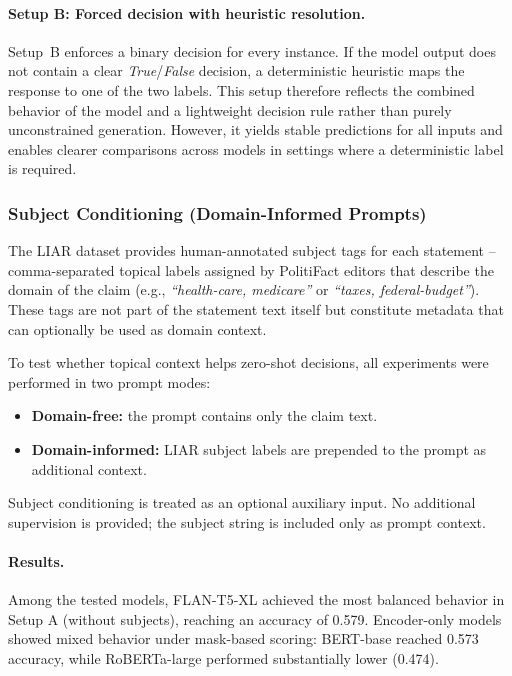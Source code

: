 \paragraph{Setup B: Forced decision with heuristic resolution.}
Setup~B enforces a binary decision for every instance. If the model output does not contain a clear \textit{True}/\textit{False} decision, a deterministic heuristic maps the response to one of the two labels. 
This setup therefore reflects the combined behavior of the model and a lightweight decision rule rather than purely unconstrained generation. 
However, it yields stable predictions for all inputs and enables clearer comparisons across models in settings where a deterministic label is required.

\subsubsection{Subject Conditioning (Domain-Informed Prompts)}

The LIAR dataset provides human-annotated subject tags for each statement -- comma-separated topical labels assigned by PolitiFact 
editors that describe the domain of the claim (e.g., \textit{``health-care, medicare''} or \textit{``taxes, federal-budget''}). These tags are not part of the statement text itself but constitute metadata that can optionally be used as domain context.

To test whether topical context helps zero-shot decisions, all experiments were performed in two prompt modes:

\begin{itemize}
    \item \textbf{Domain-free:} the prompt contains only the claim text.
    \item \textbf{Domain-informed:} LIAR subject labels are prepended to the prompt as additional context.
\end{itemize}

Subject conditioning is treated as an optional auxiliary input. No additional supervision is provided; the subject string is included only as prompt context. 

\paragraph{Results.}
Among the tested models, FLAN-T5-XL achieved the most balanced behavior in Setup A (without subjects), reaching an accuracy of 0.579. Encoder-only models showed mixed behavior under mask-based scoring: BERT-base reached 0.573 accuracy, while RoBERTa-large performed substantially lower (0.474).

